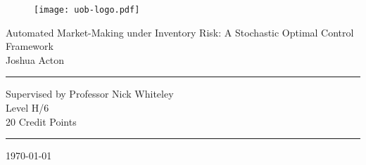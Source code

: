 \thispagestyle{plain}
\begin{titlepage}
    \begin{figure}[h]
        \begin{center}
            \texttt{[image: uob-logo.pdf]} 
        \end{center}
    \end{figure}

    \begin{center}
        {\Large Automated Market-Making under Inventory Risk: A Stochastic Optimal Control Framework\\ \vspace{1cm}Joshua Acton}
    \end{center}

    \vspace{3cm}
    \hrule
    \begin{center}
        Supervised by Professor Nick Whiteley\\
        Level H/6\\
        20 Credit Points
    \end{center}
    \hrule

    \vspace{3cm}
    \begin{center}
        \today
    \end{center}
\end{titlepage}